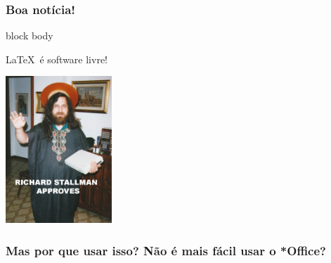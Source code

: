 \documentclass{beamer}
\begin{document}
\begin{frame}
   \frametitle{Boa notícia!}
   \begin{center}
      \begin{minipage}{5cm}
        \begin{beamercolorbox}[sep=1em,wd=5cm]{block body}
            \begin{center}
               \LaTeX\ é software livre!
            \end{center}
        \end{beamercolorbox}
      \end{minipage}
      \begin{minipage}{5cm}
         \begin{center}
            \includegraphics[width=4cm]{img/saintignuciuscopia.jpg}
         \end{center}
      \end{minipage}
   \end{center}
\end{frame}
\begin{frame}
   \frametitle{Mas por que usar isso? Não é mais fácil usar o *Office?}
   \begin{center}
      \noindent{}
    \end{center}
\end{frame}
\end{document}
